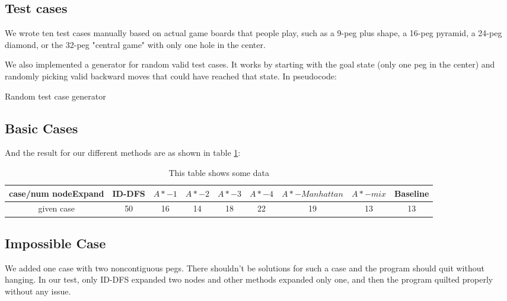 \documentclass[11pt, letter]{article}
\begin{document}
\subsection{Test cases}

We wrote ten test cases manually based on actual game boards that people play,
such as a 9-peg plus shape, a 16-peg pyramid, a 24-peg diamond, or the 32-peg
"central game" with only one hole in the center.

We also implemented a generator for random valid test cases. It works by
starting with the goal state (only one peg in the center) and randomly picking
valid backward moves that could have reached that state. In pseudocode:

\begin{algorithm}
\caption{Random test case generator}
\label{random_alg}
\begin{algorithmic}[1]
	\EndFor
	\State {}
\end{algorithmic}
\end{algorithm}

\subsection{Basic Cases}
And the result for our different methods are as shown in table \ref{tab_resbasic}:
\begin{table}[h!]
  \centering
  \begin{tabular}{ | c | c |  c | c | c | c |  c | c| c|}
\hline
case/num nodeExpand & ID-DFS & $A*- 1$ & $A*-2$ & $A*-3$ & $A*-4$ & $A*-Manhattan$ & $A*-mix$ & Baseline \\ \hline
given case & 50 & 16 & 14 & 18 & 22 & 19 & 13 & 13 \\ \hline
  \end{tabular}
  \caption{This table shows some data}
  \label{tab_resbasic}
\end{table}

\subsection{Impossible Case}
We added one case with two noncontiguous pegs. There shouldn't be solutions for such a case and the program should quit without hanging. In our test, only ID-DFS expanded two nodes and other methods expanded only one, and then the program quilted properly without any issue.
\end{document}
